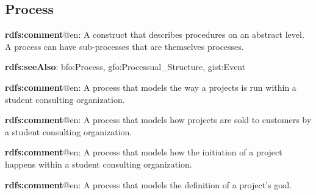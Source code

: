 \documentclass[a4paper, DIV=13, BCOR=0cm]{scrbook}
\begin{document}
\subsection{Process}
\begin{mdframed}[style=onto, frametitle={Process}]
	{%
		\begin{compactitem}
			\item \textbf{rdfs:comment}@en: A construct that describes procedures on an abstract level. A process can have sub-processes that are themselves processes.
			\item \textbf{rdfs:seeAlso}: bfo:Process, gfo:Processual\_Structure, gist:Event
		\end{compactitem}
	} %
\end{mdframed}

\begin{mdframed}[style=onto-1, frametitle={Project Process}]
	{%
		\begin{compactitem}
			\item \textbf{rdfs:comment}@en: A process that models the way a projects is run within a student consulting organization.
		\end{compactitem}
	} %
\end{mdframed}

\begin{mdframed}[style=onto-2, frametitle={Project Sales Process}]
	{%
		\begin{compactitem}
			\item \textbf{rdfs:comment}@en: A process that models how projects are sold to customers by a student consulting organization.
		\end{compactitem}
	} %
\end{mdframed}

\begin{mdframed}[style=onto-2, frametitle={Project Initiation Process}]
	{%
		\begin{compactitem}
			\item \textbf{rdfs:comment}@en: A process that models how the initiation of a project happens within a student consulting organization.
		\end{compactitem}
	} %
\end{mdframed}

\begin{mdframed}[style=onto-3, frametitle={Project Goal Development Process}]
	{%
		\begin{compactitem}
			\item \textbf{rdfs:comment}@en: A process that models the definition of a project's goal.
		\end{compactitem}
	} %
\end{mdframed}
\end{document}
